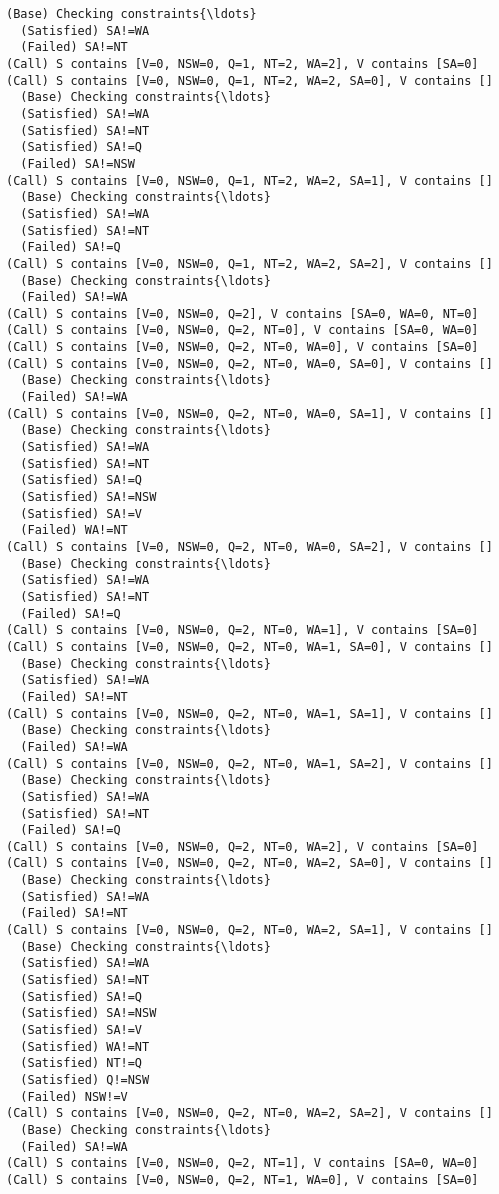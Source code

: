 \documentclass[11pt]{article}
\begin{document}
\begin{Verbatim}[commandchars=\\\{\}]
  (Base) Checking constraints{\ldots}
  (Satisfied) SA!=WA
  (Failed) SA!=NT
(Call) S contains [V=0, NSW=0, Q=1, NT=2, WA=2], V contains [SA=0]
(Call) S contains [V=0, NSW=0, Q=1, NT=2, WA=2, SA=0], V contains []
  (Base) Checking constraints{\ldots}
  (Satisfied) SA!=WA
  (Satisfied) SA!=NT
  (Satisfied) SA!=Q
  (Failed) SA!=NSW
(Call) S contains [V=0, NSW=0, Q=1, NT=2, WA=2, SA=1], V contains []
  (Base) Checking constraints{\ldots}
  (Satisfied) SA!=WA
  (Satisfied) SA!=NT
  (Failed) SA!=Q
(Call) S contains [V=0, NSW=0, Q=1, NT=2, WA=2, SA=2], V contains []
  (Base) Checking constraints{\ldots}
  (Failed) SA!=WA
(Call) S contains [V=0, NSW=0, Q=2], V contains [SA=0, WA=0, NT=0]
(Call) S contains [V=0, NSW=0, Q=2, NT=0], V contains [SA=0, WA=0]
(Call) S contains [V=0, NSW=0, Q=2, NT=0, WA=0], V contains [SA=0]
(Call) S contains [V=0, NSW=0, Q=2, NT=0, WA=0, SA=0], V contains []
  (Base) Checking constraints{\ldots}
  (Failed) SA!=WA
(Call) S contains [V=0, NSW=0, Q=2, NT=0, WA=0, SA=1], V contains []
  (Base) Checking constraints{\ldots}
  (Satisfied) SA!=WA
  (Satisfied) SA!=NT
  (Satisfied) SA!=Q
  (Satisfied) SA!=NSW
  (Satisfied) SA!=V
  (Failed) WA!=NT
(Call) S contains [V=0, NSW=0, Q=2, NT=0, WA=0, SA=2], V contains []
  (Base) Checking constraints{\ldots}
  (Satisfied) SA!=WA
  (Satisfied) SA!=NT
  (Failed) SA!=Q
(Call) S contains [V=0, NSW=0, Q=2, NT=0, WA=1], V contains [SA=0]
(Call) S contains [V=0, NSW=0, Q=2, NT=0, WA=1, SA=0], V contains []
  (Base) Checking constraints{\ldots}
  (Satisfied) SA!=WA
  (Failed) SA!=NT
(Call) S contains [V=0, NSW=0, Q=2, NT=0, WA=1, SA=1], V contains []
  (Base) Checking constraints{\ldots}
  (Failed) SA!=WA
(Call) S contains [V=0, NSW=0, Q=2, NT=0, WA=1, SA=2], V contains []
  (Base) Checking constraints{\ldots}
  (Satisfied) SA!=WA
  (Satisfied) SA!=NT
  (Failed) SA!=Q
(Call) S contains [V=0, NSW=0, Q=2, NT=0, WA=2], V contains [SA=0]
(Call) S contains [V=0, NSW=0, Q=2, NT=0, WA=2, SA=0], V contains []
  (Base) Checking constraints{\ldots}
  (Satisfied) SA!=WA
  (Failed) SA!=NT
(Call) S contains [V=0, NSW=0, Q=2, NT=0, WA=2, SA=1], V contains []
  (Base) Checking constraints{\ldots}
  (Satisfied) SA!=WA
  (Satisfied) SA!=NT
  (Satisfied) SA!=Q
  (Satisfied) SA!=NSW
  (Satisfied) SA!=V
  (Satisfied) WA!=NT
  (Satisfied) NT!=Q
  (Satisfied) Q!=NSW
  (Failed) NSW!=V
(Call) S contains [V=0, NSW=0, Q=2, NT=0, WA=2, SA=2], V contains []
  (Base) Checking constraints{\ldots}
  (Failed) SA!=WA
(Call) S contains [V=0, NSW=0, Q=2, NT=1], V contains [SA=0, WA=0]
(Call) S contains [V=0, NSW=0, Q=2, NT=1, WA=0], V contains [SA=0]

\end{Verbatim}
\end{document}
